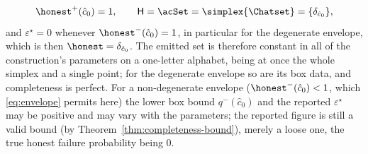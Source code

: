 \begin{theorem}
\begin{enumerate}[label=(\roman*),leftmargin=2.2em]
\begin{equation*}
  {\honest}^{+}(\hat c_0)=1,
  \qquad
  \mathsf{H}=\acSet=\simplex{\Chatset}=\{\delta_{\hat c_0}\},
\end{equation*}
and $\varepsilon^{\star}=0$ whenever ${\honest}^{-}(\hat c_0)=1$, in
particular for the degenerate envelope, which is then
$\honest=\delta_{\hat c_0}$. The emitted set is therefore constant in all of
the construction's parameters on a one-letter alphabet, being at once the
whole simplex and a single point; for the degenerate envelope so are its box
data, and completeness is perfect. For a non-degenerate envelope
(${\honest}^{-}(\hat c_0)<1$, which \eqref{eq:envelope} permits here) the
lower box bound $q^{-}(\hat c_0)$ and the reported $\varepsilon^{\star}$ may be
positive and may vary with the parameters; the reported figure is still a
valid bound (by Theorem~\ref{thm:completeness-bound}), merely a loose one, the true honest
failure probability being $0$.
\end{enumerate}
\end{theorem}


